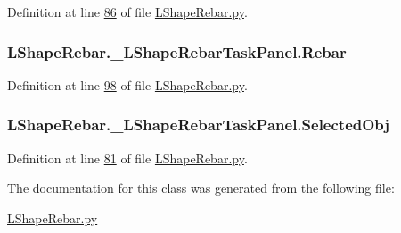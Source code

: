 Definition at line \hyperlink{LShapeRebar_8py_source_l00086}{86} of file \hyperlink{LShapeRebar_8py_source}{L\+Shape\+Rebar.\+py}.

\subsubsection[{\texorpdfstring{Rebar}{Rebar}}]{\setlength{\rightskip}{0pt plus 5cm}L\+Shape\+Rebar.\+\_\+\+L\+Shape\+Rebar\+Task\+Panel.\+Rebar}\hypertarget{classLShapeRebar_1_1__LShapeRebarTaskPanel_a4a64ebfb73de83fd42f3a349272e69c7}{}\label{classLShapeRebar_1_1__LShapeRebarTaskPanel_a4a64ebfb73de83fd42f3a349272e69c7}


Definition at line \hyperlink{LShapeRebar_8py_source_l00098}{98} of file \hyperlink{LShapeRebar_8py_source}{L\+Shape\+Rebar.\+py}.

\subsubsection[{\texorpdfstring{Selected\+Obj}{SelectedObj}}]{\setlength{\rightskip}{0pt plus 5cm}L\+Shape\+Rebar.\+\_\+\+L\+Shape\+Rebar\+Task\+Panel.\+Selected\+Obj}\hypertarget{classLShapeRebar_1_1__LShapeRebarTaskPanel_a71f1ee825528164c18315a0234f6da5d}{}\label{classLShapeRebar_1_1__LShapeRebarTaskPanel_a71f1ee825528164c18315a0234f6da5d}


Definition at line \hyperlink{LShapeRebar_8py_source_l00081}{81} of file \hyperlink{LShapeRebar_8py_source}{L\+Shape\+Rebar.\+py}.



The documentation for this class was generated from the following file\+:\begin{DoxyCompactItemize}
\item 
\hyperlink{LShapeRebar_8py}{L\+Shape\+Rebar.\+py}\end{DoxyCompactItemize}
